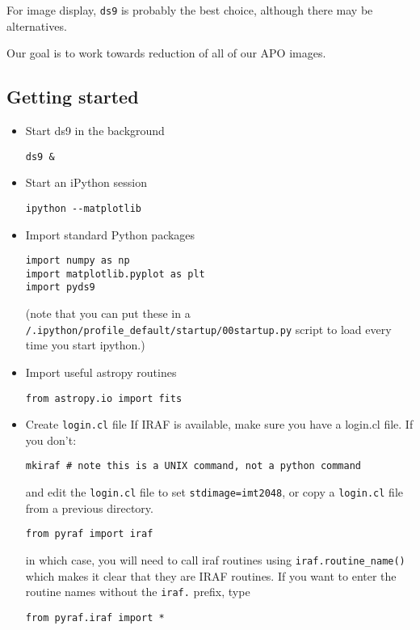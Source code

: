 \documentclass[12pt]{article}
\begin{document}
For image display, \texttt{ds9} is probably the best choice, although there may
be alternatives.

Our goal is to work towards reduction of all of our APO images.

\subsection*{Getting started}
\begin{itemize}
\item Start ds9 in the background
\begin{verbatim}
ds9 &
\end{verbatim}
\item Start an iPython session
\begin{verbatim}
ipython --matplotlib
\end{verbatim}

\item Import standard Python packages
\begin{verbatim}
import numpy as np
import matplotlib.pyplot as plt
import pyds9
\end{verbatim}
(note that you can put these in a
\texttt{/.ipython/profile\_default/startup/00startup.py}
script to load every time you start ipython.)

\item Import useful astropy routines
\begin{verbatim}
from astropy.io import fits
\end{verbatim}

\item Create \texttt{login.cl} file
If IRAF is available, make sure you have a login.cl file. If you don't:
\begin{verbatim}
mkiraf # note this is a UNIX command, not a python command
\end{verbatim}
and edit the \texttt{login.cl} file to set \texttt{stdimage=imt2048},
or copy a \texttt{login.cl} file from a previous directory.
\begin{verbatim}
from pyraf import iraf
\end{verbatim}
in which case, you will need to call iraf routines using
\texttt{iraf.routine\_name()}
which makes it clear that they are IRAF routines. If you want to
enter the routine names without the \texttt{iraf.} prefix, type
\begin{verbatim}
from pyraf.iraf import *
\end{verbatim}
\end{itemize}
\end{document}
